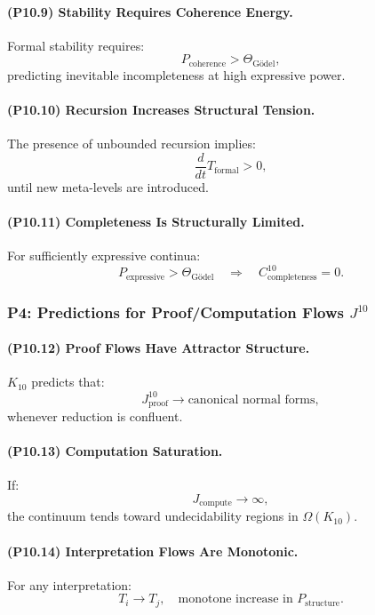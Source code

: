 \paragraph{(P10.9) Stability Requires Coherence Energy.}
Formal stability requires:
\[
P_{\mathrm{coherence}} > \Theta_{\mathrm{Gödel}},
\]
predicting inevitable incompleteness at high expressive power.

\paragraph{(P10.10) Recursion Increases Structural Tension.}
The presence of unbounded recursion implies:
\[
\frac{d}{dt} T_{\mathrm{formal}} > 0,
\]
until new meta-levels are introduced.

\paragraph{(P10.11) Completeness Is Structurally Limited.}
For sufficiently expressive continua:
\[
P_{\mathrm{expressive}} > \Theta_{\mathrm{Gödel}}
\quad \Rightarrow \quad
C_{\mathrm{completeness}}^{10} = 0.
\]

\subsubsection{P4: Predictions for Proof/Computation Flows $J^{10}$}

\paragraph{(P10.12) Proof Flows Have Attractor Structure.}
$K_{10}$ predicts that:
\[
J_{\mathrm{proof}}^{10} \to \text{canonical normal forms},
\]
whenever reduction is confluent.

\paragraph{(P10.13) Computation Saturation.}
If:
\[
J_{\mathrm{compute}} \to \infty,
\]
the continuum tends toward undecidability regions in $\Omega(K_{10})$.

\paragraph{(P10.14) Interpretation Flows Are Monotonic.}
For any interpretation:
\[
T_i \to T_j,
\quad
\text{monotone increase in } P_{\mathrm{structure}}.
\]

